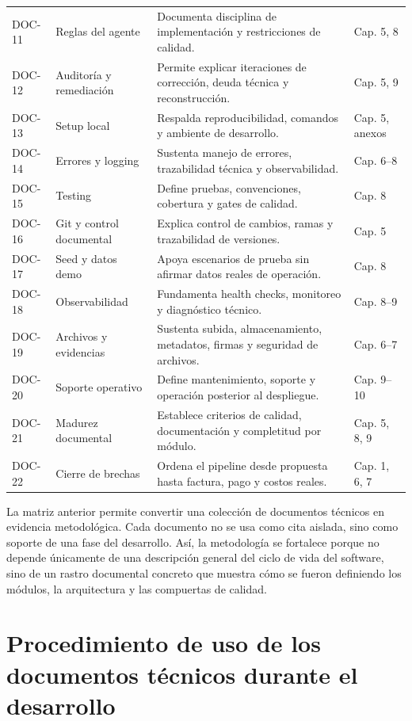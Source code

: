 \begin{longtable}{|p{1.6cm}|p{4.2cm}|p{5.1cm}|p{3.2cm}|}
DOC-11 & Reglas del agente & Documenta disciplina de implementación y restricciones de calidad. & Cap. 5, 8\\
DOC-12 & Auditoría y remediación & Permite explicar iteraciones de corrección, deuda técnica y reconstrucción. & Cap. 5, 9\\
DOC-13 & Setup local & Respalda reproducibilidad, comandos y ambiente de desarrollo. & Cap. 5, anexos\\
DOC-14 & Errores y logging & Sustenta manejo de errores, trazabilidad técnica y observabilidad. & Cap. 6--8\\
DOC-15 & Testing & Define pruebas, convenciones, cobertura y gates de calidad. & Cap. 8\\
DOC-16 & Git y control documental & Explica control de cambios, ramas y trazabilidad de versiones. & Cap. 5\\
DOC-17 & Seed y datos demo & Apoya escenarios de prueba sin afirmar datos reales de operación. & Cap. 8\\
DOC-18 & Observabilidad & Fundamenta health checks, monitoreo y diagnóstico técnico. & Cap. 8--9\\
DOC-19 & Archivos y evidencias & Sustenta subida, almacenamiento, metadatos, firmas y seguridad de archivos. & Cap. 6--7\\
DOC-20 & Soporte operativo & Define mantenimiento, soporte y operación posterior al despliegue. & Cap. 9--10\\
DOC-21 & Madurez documental & Establece criterios de calidad, documentación y completitud por módulo. & Cap. 5, 8, 9\\
DOC-22 & Cierre de brechas & Ordena el pipeline desde propuesta hasta factura, pago y costos reales. & Cap. 1, 6, 7\\
\end{longtable}

La matriz anterior permite convertir una colección de documentos técnicos en evidencia metodológica. Cada documento no se usa como cita aislada, sino como soporte de una fase del desarrollo. Así, la metodología se fortalece porque no depende únicamente de una descripción general del ciclo de vida del software, sino de un rastro documental concreto que muestra cómo se fueron definiendo los módulos, la arquitectura y las compuertas de calidad.

\section{Procedimiento de uso de los documentos técnicos durante el desarrollo}
\label{sec:procedimiento-uso-docs-desarrollo}

